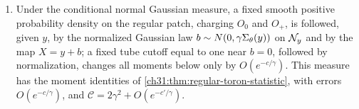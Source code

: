 \begin{lemma}
\begin{enumerate}
\[\]
and if $\sigma_*=0$ the regular patch has mass zero. In particular $\E\psi=O(e^{-c/\gamma})$. The constants may depend on the fixed covariance and smoothing of this measure, as well as on the fixed data.
\item Under the conditional normal Gaussian measure, a fixed smooth positive probability density on the regular patch, charging $O_0$ and $O_+$, is followed, given $y$, by the normalized Gaussian law $b\sim N(0,\gamma\Sigma_\theta(y))$ on $\mathcal N_{y}$ and by the map $X=y+b$; a fixed tube cutoff equal to one near $b=0$, followed by normalization, changes all moments below only by $O(e^{-c/\gamma})$. This measure has the moment identities of \cref{ch31:thm:regular-toron-statistic}, with errors $O(e^{-c/\gamma})$, and $\mathscr C=2\gamma^2+O(e^{-c'/\gamma})$.
\end{enumerate}
\end{lemma}

